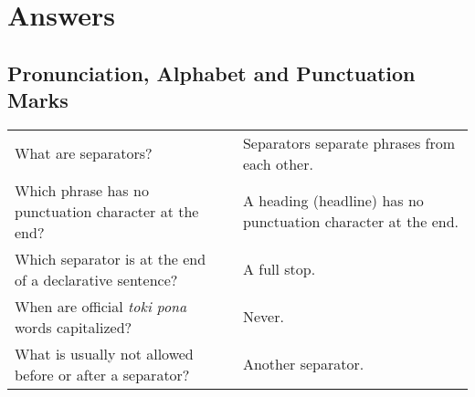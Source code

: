\section{Answers}

\subsection*{Pronunciation, Alphabet and Punctuation Marks} 
\label{'pronunciation_alphabet'}
%
\begin{supertabular}{p{5,5cm}|ll}
What are separators? && Separators separate phrases from each other.  \\ %
Which phrase has no punctuation character at the end? && A heading (headline) has no punctuation character at the end. \\ %
Which separator is at the end of a declarative sentence? && A full stop. \\ %
When are official \textit{toki pona} words capitalized? && Never. \\ %
What is usually not allowed before or after a separator? && Another separator. \\ %
\end{supertabular} 

\newpage
%
